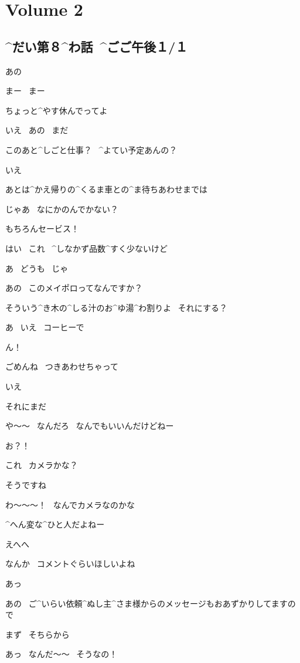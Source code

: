 \section{Volume 2}

\subsection{^{だい}{第}８^{わ}{話}\ ^{ごご}{午後}１/１}

\page[4]
\K あの

\A まー
\ まー

\A ちょっと^{やす}{休}んでってよ

\K いえ
\ あの
\ まだ

\A このあと^{しごと}{仕事}？
\ ^{よてい}{予定}あんの？

\K いえ

\K あとは^{かえ}{帰}りの^{くるま}{車}との^{ま}{待}ちあわせまでは

\A じゃあ
\ なにかのんでかない？

\A もちろんセービス！

\A はい
\ これ
\ ^{しなかず}{品数}^{すく}{少}ないけど

\K あ
\ どうも
\ じゃ

\page
\K あの
\ このメイポロってなんですか？

\A そういう^{き}{木}の^{しる}{汁}のお^{ゆ}{湯}^{わ}{割}りよ
\ それにする？

\K あ
\ いえ
\ コーヒーで

\A ん！

\A ごめんね
\ つきあわせちゃって

\K いえ

\K それにまだ

\A や〜〜
\ なんだろ
\ なんでもいいんだけどねー

\page
\A お？！

\A これ
\ カメラかな？

\K そうですね

\A わ〜〜〜！
\ なんでカメラなのかな

\A ^{へん}{変}な^{ひと}{人}だよねー

\A えへへ

\A なんか
\ コメントぐらいほしいよね

\K あっ

\page
\K あの
\ ご^{いらい}{依頼}^{ぬし}{主}^{さま}{様}からのメッセージもおあずかりしてますので

\K まず
\ そちらから

\A あっ
\ なんだ〜〜
\ そうなの！


